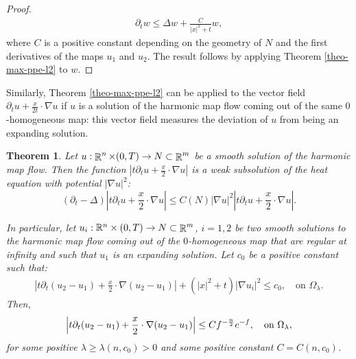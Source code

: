 \documentclass[a4paper,11pt,reqno]{amsart}
\newtheorem{theo}[defn]{Theorem}
\def\R{\mathop{\rm \mathbb{R}}\nolimits}
\begin{document}
\begin{proof}
\begin{eqnarray*}
\partial_tw\leq \Delta w+\frac{C}{|x|^2+t}w,
\end{eqnarray*}
where $C$ is a positive constant depending on the geometry of $N$ and the first derivatives of the maps $u_1$ and $u_2$.
The result follows by applying Theorem \ref{theo-max-ppe-l2} to $w$.
\end{proof}





Similarly, Theorem \ref{theo-max-ppe-l2} can be applied to the vector field $\partial_tu+\frac{x}{2t}\cdot\nabla u$ if $u$ is a solution of the harmonic map flow coming out of the same $0$-homogeneous map: this vector field measures the deviation of $u$ from being an expanding solution.

\begin{theo}\label{comp-exp-sol-gal-sol}
Let $u:\R^n\times(0,T)\rightarrow N\subset\R^{m}$ be a smooth solution of the harmonic map flow. Then the function $\left|t\partial_tu+\frac{x}{2}\cdot\nabla u\right|$ is a weak subsolution of the heat equation with potential $|\nabla u|^2$:
$$(\partial_t-\Delta) \left|t\partial_tu+\frac{x}{2}\cdot\nabla u\right|\leq C(N)|\nabla u|^2\left|t\partial_tu+\frac{x}{2}\cdot\nabla u\right|.$$

In particular, let $u_i:\mathbb{R}^n\times(0,T)\rightarrow N\subset \R^m$, $i=1,2$ be two smooth solutions to the harmonic map flow coming out of the $0$-homogeneous map that are regular at infinity and such that $u_1$ is an expanding solution. Let $c_0$ be a positive constant such that:
\begin{eqnarray*}
\left|t\partial_t(u_2-u_1)+\frac{x}{2}\cdot\nabla (u_2-u_1)\right|+(|x|^2+t)|\nabla u_i|^2\leq c_0,\quad \text{on $\Omega_{\lambda}$}.
\end{eqnarray*}
Then,
\begin{eqnarray}
\left|t\partial_t(u_2-u_1)+\frac{x}{2}\cdot\nabla (u_2-u_1)\right|\leq Cf^{-\frac{n}{2}}e^{-f},\quad \text{on $ \Omega_{\lambda}$},\label{fast-decay-diff-sol-ene}
\end{eqnarray}
 for some positive $\lambda\geq \lambda(n,c_0)>0$ and some positive constant $C=C(n,c_0)$. 

\end{theo}
\end{document}
